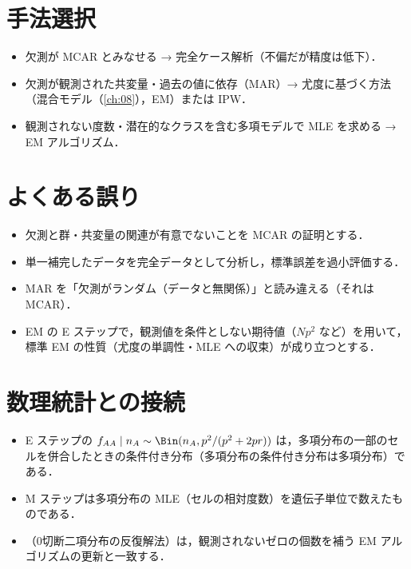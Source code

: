 \section{手法選択}\label{sec:16-choice}
\begin{itemize}
\item 欠測が MCAR とみなせる → 完全ケース解析（不偏だが精度は低下）．
\item 欠測が観測された共変量・過去の値に依存（MAR）→ 尤度に基づく方法（混合モデル（\cref{ch:08}），EM）または IPW．
\item 観測されない度数・潜在的なクラスを含む多項モデルで MLE を求める → EM アルゴリズム．
\end{itemize}

\section{よくある誤り}\label{sec:16-err}
\begin{warnbox}
\begin{itemize}
\item 欠測と群・共変量の関連が有意でないことを MCAR の証明とする．
\item 単一補完したデータを完全データとして分析し，標準誤差を過小評価する．
\item MAR を「欠測がランダム（データと無関係）」と読み違える（それは MCAR）．
\item EM の E ステップで，観測値を条件としない期待値（$Np^2$ など）を用いて，標準 EM の性質（尤度の単調性・MLE への収束）が成り立つとする．
\end{itemize}
\end{warnbox}

\section{数理統計との接続}\label{sec:16-link}
\begin{linkbox}
\begin{itemize}
\item E ステップの $f_{AA}\mid n_A\sim\Bin(n_A,p^2/(p^2+2pr))$ は，多項分布の一部のセルを併合したときの条件付き分布（多項分布の条件付き分布は多項分布）である．
\item M ステップは多項分布の MLE（セルの相対度数）を遺伝子単位で数えたものである．
\item {}（0切断二項分布の反復解法）は，観測されないゼロの個数を補う EM アルゴリズムの更新と一致する．
\end{itemize}
\end{linkbox}

